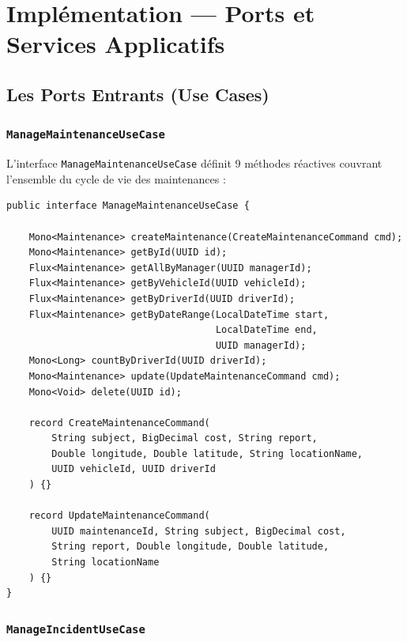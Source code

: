 \documentclass[12pt,a4paper]{report}
\begin{document}
\chapter{Implémentation — Ports et Services Applicatifs}

\section{Les Ports Entrants (Use Cases)}

\subsection{\texttt{ManageMaintenanceUseCase}}

L'interface \texttt{ManageMaintenanceUseCase} définit 9 méthodes réactives couvrant l'ensemble du cycle de vie des maintenances :

\begin{lstlisting}[style=javaStyle, caption={Interface ManageMaintenanceUseCase}]
public interface ManageMaintenanceUseCase {

    Mono<Maintenance> createMaintenance(CreateMaintenanceCommand cmd);
    Mono<Maintenance> getById(UUID id);
    Flux<Maintenance> getAllByManager(UUID managerId);
    Flux<Maintenance> getByVehicleId(UUID vehicleId);
    Flux<Maintenance> getByDriverId(UUID driverId);
    Flux<Maintenance> getByDateRange(LocalDateTime start,
                                     LocalDateTime end,
                                     UUID managerId);
    Mono<Long> countByDriverId(UUID driverId);
    Mono<Maintenance> update(UpdateMaintenanceCommand cmd);
    Mono<Void> delete(UUID id);

    record CreateMaintenanceCommand(
        String subject, BigDecimal cost, String report,
        Double longitude, Double latitude, String locationName,
        UUID vehicleId, UUID driverId
    ) {}

    record UpdateMaintenanceCommand(
        UUID maintenanceId, String subject, BigDecimal cost,
        String report, Double longitude, Double latitude,
        String locationName
    ) {}
}
\end{lstlisting}

\subsection{\texttt{ManageIncidentUseCase}}
\end{document}
